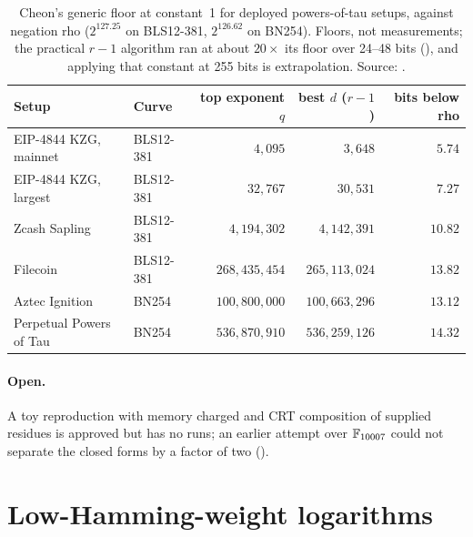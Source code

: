 \begin{table}[t]
\centering\small
\begin{tabular}{@{}llrrr@{}}
\toprule
Setup & Curve & top exponent $q$ & best $d$ ($r-1$) & bits below rho \\
\midrule
EIP-4844 KZG, mainnet & BLS12-381 & $4{,}095$ & $3{,}648$ & $5.74$ \\
EIP-4844 KZG, largest & BLS12-381 & $32{,}767$ & $30{,}531$ & $7.27$ \\
Zcash Sapling & BLS12-381 & $4{,}194{,}302$ & $4{,}142{,}391$ & $10.82$ \\
Filecoin & BLS12-381 & $268{,}435{,}454$ & $265{,}113{,}024$ & $13.82$ \\
Aztec Ignition & BN254 & $100{,}800{,}000$ & $100{,}663{,}296$ & $13.12$ \\
Perpetual Powers of Tau & BN254 & $536{,}870{,}910$ & $536{,}259{,}126$ & $14.32$ \\
\bottomrule
\end{tabular}
\caption[]{Cheon's generic floor at constant~1 for deployed powers-of-tau
setups, against negation rho ($2^{127.25}$ on BLS12-381, $2^{126.62}$ on
BN254). Floors, not measurements; the practical $r-1$ algorithm ran at
about $20\times$ its floor over 24--48 bits
(), and applying that
constant at 255 bits is extrapolation. Source:
.}
\label{tab:gf-srs}
\end{table}

\paragraph{Open.} A toy reproduction with memory charged and CRT
composition of supplied residues is approved but has no runs; an earlier
attempt over $\mathbb{F}_{10007}$ could not separate the closed forms by a factor
of two ().

\section{Low-Hamming-weight logarithms}\label{sec:gf-lhw}

